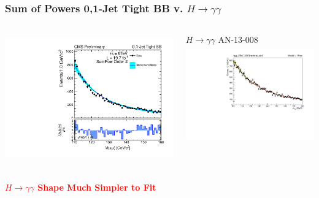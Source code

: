 \documentclass{beamer}
\begin{document}
\begin{frame}
\frametitle{Sum of Powers 0,1-Jet Tight BB v. $H\rightarrow\gamma\gamma$}
  \begin{columns}[c]
   \column{60mm}
      \begin{center}
        \includegraphics[height=55mm]{wholeRangeHggStudy1/plotsOrderStudyExpPow/order_Shape_Jets01PassPtG10BB_SumPow2}
      \end{center}
   \column{60mm}
      \begin{center}
        $H\rightarrow\gamma\gamma$ AN-13-008 \\
        \includegraphics[height=42mm]{wholeRangeHggStudy1/plotsHgg/truth_hgg_8TeV_2013moriond_cic0_1Pow}
      \end{center}
  \end{columns}
  \begin{center}
    \bf
    \textcolor{red}{
    $H\rightarrow\gamma\gamma$ Shape Much Simpler to Fit
    }
  \end{center}
\end{frame}
\end{document}
